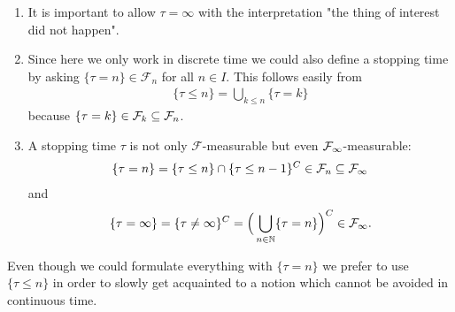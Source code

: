 \begin{remark}
	\begin{enumerate}[label=(\roman*)]
		\item It is important to allow $\tau=\infty$ with the interpretation  "{}the thing of interest did not happen"{}.
				\item	Since here we only work in discrete time we could also define a stopping time by asking $\{\tau=n\}\in \mathcal F_n$ for all $n\in I$. This follows easily from
			\begin{align*}
				 \lbrace \tau \leq n \rbrace = \bigcup\limits_{k\leq n}\lbrace \tau = k \rbrace 
			\end{align*}
			because $\lbrace \tau = k \rbrace \in \mathcal{F}_k \subseteq \mathcal{F}_n$.
		\item
			A stopping time $\tau$ is not only $\mathcal F$-measurable but even $\mathcal{F}_{\infty}$-measurable:
			\begin{align*}
				\lbrace \tau =n \rbrace=\lbrace \tau \leq n\}\cap \{\tau \leq n-1\}^C\in \mathcal{F}_n\subseteq  \mathcal{F}_{\infty}
			\end{align*}
			and
			\begin{align*}
				\lbrace \tau = \infty \rbrace = \lbrace \tau \neq \infty \rbrace^C = \Big( \bigcup\limits_{n\in\mathbb{N}} \lbrace \tau = n \rbrace \Big)^C \in \mathcal{F}_{\infty}.
			\end{align*}	
	\end{enumerate}
\end{remark}
Even though we could formulate everything with $\{\tau =n\}$ we prefer to use $\{\tau \leq n\}$ in order to slowly get acquainted to a notion which cannot be avoided in continuous time.\smallskip


